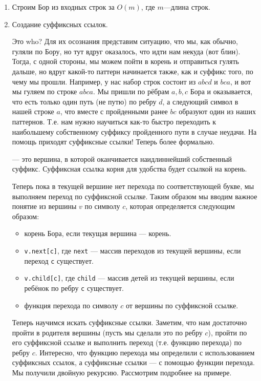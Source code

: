 \begin{enumerate}
        \item Строим Бор из входных строк за $O(m)$, где  $m$---длина строк.
        \item Создание суффиксных ссылок.

        Это who? Для их осознания представим ситуацию, что мы, как обычно, гуляли по Бору, но тут вдруг
        оказалось, что идти нам некуда (вот блин). Тогда, с одной стороны, мы можем пойти в корень и 
        отправиться гулять дальше, но вдруг какой-то паттерн начинается также, как и суффикс того, по чему 
        мы прошли. Например, у нас набор строк состоит из $abcd$ и  $bca$, и
        вот мы гуляем по строке $abca$. Мы пришли по рёбрам  $a, b, c$ Бора и оказывается, что есть только
        один путь (не путю) по ребру $d$, а следующий символ в нашей строке $a$, что вместе с пройденными
        ранее $bc$ образуют один из наших паттернов. Т.е. нам нужно научиться как-то быстро переходить 
        к наибольшему собственному суффиксу пройденного пути в случае неудачи. На помощь приходят
        суффиксные ссылки! Теперь более формально.
        \begin{definition}
                 --- это вершина, в которой оканчивается наидлиннейший
                собственный суффикс. Суффиксная ссылка корня для удобства будет ссылкой на корень.
        \end{definition}
       Теперь пока в текущей вершине нет перехода по соответствующей букве, мы выполняем переход по
       суффиксной ссылке. Таким образом мы вводим важное понятие  из вершины $v$ 
       по символу $c$, которая определяется следующим образом:
       \begin{itemize}
                \item корень Бора, если текущая вершина --- корень. 
                \item \lstinline{v.next[c]}, где \lstinline{next} --- массив переходов из текущей вершины, если
                переход \lstinline{c} существует.
                \item \lstinline{v.child[c]}, где \lstinline{child} --- массив детей из текущей вершины,
                если ребёнок по ребру \lstinline{c} существует.
                \item функция перехода по символу $c$ от вершины по суффиксной ссылке.
       \end{itemize}
       
       Теперь научимся искать суффиксные ссылки. Заметим, что нам достаточно пройти в родителя вершины
       (пусть мы сделали это по ребру $c$), пройти
       по его суффиксной ссылке и выполнить переход (т.е. функцию перехода) по ребру $c$. 
       Интересно, что функцию перехода мы определили с использованием суффиксных ссылок, а
       суффиксные ссылки --- с помощью функции перехода. Мы получили двойную рекурсию.
       Рассмотрим подробнее на примере.


\end{enumerate}
